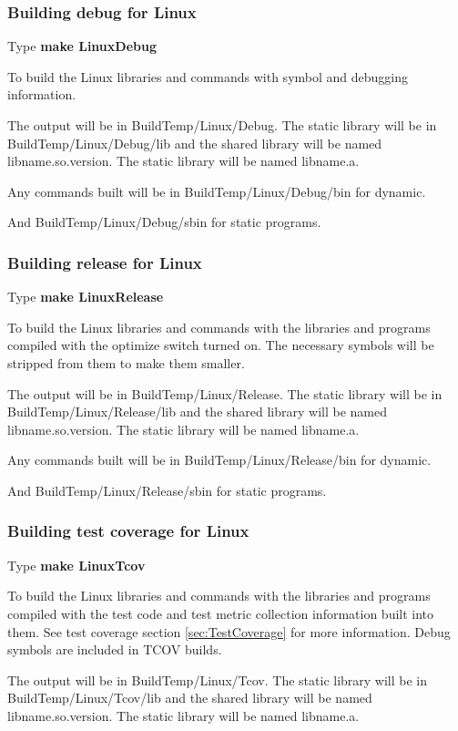 \subsubsection{Building debug for Linux}
Type \textbf{make LinuxDebug}

To build the Linux libraries and commands with symbol
and debugging information.
  
The output will be in BuildTemp/Linux/Debug.
The static library will be in BuildTemp/Linux/Debug/lib
and the shared library will be named lib{name}.so.{version}.
The static library will be named lib{name}.a.
  
Any commands built will be in BuildTemp/Linux/Debug/bin
for dynamic.

And BuildTemp/Linux/Debug/sbin for static programs.

\subsubsection{Building release for Linux}
Type \textbf{make LinuxRelease}

To build the Linux libraries and commands with the libraries
and programs compiled with the optimize switch turned on.
The necessary symbols will be stripped from them to make
them smaller.

The output will be in BuildTemp/Linux/Release.
The static library will be in BuildTemp/Linux/Release/lib
and the shared library will be named lib{name}.so.{version}.
The static library will be named lib{name}.a.
  
Any commands built will be in BuildTemp/Linux/Release/bin
for dynamic.

And BuildTemp/Linux/Release/sbin for static programs.

\subsubsection{Building test coverage for Linux}
Type \textbf{make LinuxTcov}

To build the Linux libraries and commands with the libraries
and programs compiled with the test code and test metric
collection information built into them.
See test coverage section \ref{sec:TestCoverage} for more information.
Debug symbols are included in TCOV builds.

The output will be in BuildTemp/Linux/Tcov.
The static library will be in BuildTemp/Linux/Tcov/lib
and the shared library will be named lib{name}.so.{version}.
The static library will be named lib{name}.a.

